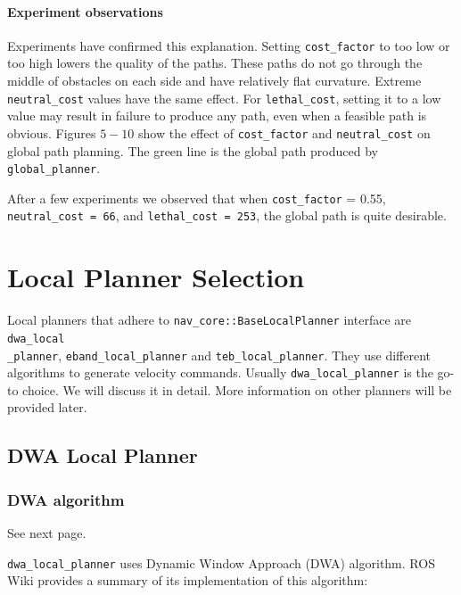 \documentclass[12pt]{article}
\begin{document}
\paragraph{Experiment observations} Experiments have confirmed this explanation. Setting \texttt{cost\_factor} to too low or too high lowers
the quality of the paths. These paths do not go through the middle of obstacles on each side and have relatively flat curvature. Extreme
\texttt{neutral\_cost} values have the same effect. For \texttt{lethal\_cost}, setting it to a low value may result
in failure to produce any path, even when a feasible path is obvious. Figures $5-10$ show the effect of \texttt{cost\_factor} and \texttt{neutral\_cost} on global path planning. The green line is the global path produced by \texttt{global\_planner}.

After a few experiments we observed that when \texttt{cost\_factor} = 0.55, \texttt{neutral\_cost = 66}, and \texttt{lethal\_cost = 253}, the global path is quite desirable.

\section{Local Planner Selection}

Local planners that adhere to \texttt{nav\_core::BaseLocalPlanner} interface are \texttt{dwa\_local\\\_planner}, \texttt{eband\_local\_planner} and \texttt{teb\_local\_planner}.
They use different algorithms to generate velocity commands. Usually \texttt{dwa\_local\_planner} is the go-to choice. We will discuss it in detail. More
information on other planners will be provided later.

\subsection{DWA Local Planner}
\subsubsection{DWA algorithm}

See next page.

\newpage
\texttt{dwa\_local\_planner} uses Dynamic Window Approach (DWA) algorithm. ROS Wiki provides a summary of its implementation of this algorithm:
\end{document}
